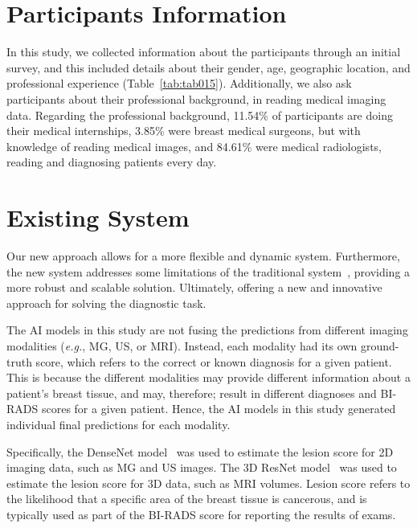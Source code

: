 \section{Participants Information}
\label{sec:app001003}

In this study, we collected information about the participants through an initial survey, and this included details about their gender, age, geographic location, and professional experience (Table~\ref{tab:tab015}).
Additionally, we also ask participants about their professional background, in reading medical imaging data.
Regarding the professional background, 11.54\% of participants are doing their medical internships, 3.85\% were breast medical surgeons, but with knowledge of reading medical images, and 84.61\% were medical radiologists, reading and diagnosing patients every day.



\section{Existing System}
\label{sec:app001004}

Our new approach allows for a more flexible and dynamic system.
Furthermore, the new system addresses some limitations of the traditional system~\cite{CALISTO2022102285}, providing a more robust and scalable solution.
Ultimately, offering a new and innovative approach for solving the diagnostic task.

The \ac{AI} models in this study are not fusing the predictions from different imaging modalities ({\it e.g.}, \ac{MG}, \ac{US}, or \ac{MRI}).
Instead, each modality had its own ground-truth score, which refers to the correct or known diagnosis for a given patient.
This is because the different modalities may provide different information about a patient's breast tissue, and may, therefore; result in different diagnoses and \ac{BI-RADS} scores for a given patient.
Hence, the \ac{AI} models in this study generated individual final predictions for each modality.

Specifically, the DenseNet model~\cite{8721151} was used to estimate the lesion score for 2D imaging data, such as \ac{MG} and \ac{US} images.
The 3D ResNet model~\cite{Aldoj2020} was used to estimate the lesion score for 3D data, such as \ac{MRI} volumes.
Lesion score refers to the likelihood that a specific area of the breast tissue is cancerous, and is typically used as part of the \ac{BI-RADS} score for reporting the results of exams.


